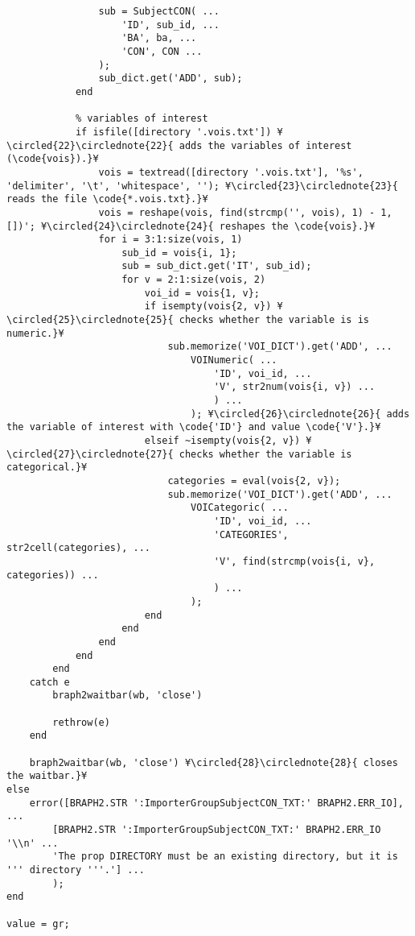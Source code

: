 \documentclass{tufte-handout}
\begin{document}
\begin{lstlisting}
                sub = SubjectCON( ...
                    'ID', sub_id, ...
                    'BA', ba, ...
                    'CON', CON ...
                );
                sub_dict.get('ADD', sub);
            end
            
            % variables of interest
            if isfile([directory '.vois.txt']) ¥\circled{22}\circlednote{22}{ adds the variables of interest (\code{vois}).}¥
                vois = textread([directory '.vois.txt'], '%s', 'delimiter', '\t', 'whitespace', ''); ¥\circled{23}\circlednote{23}{ reads the file \code{*.vois.txt}.}¥
                vois = reshape(vois, find(strcmp('', vois), 1) - 1, [])'; ¥\circled{24}\circlednote{24}{ reshapes the \code{vois}.}¥
                for i = 3:1:size(vois, 1)
                    sub_id = vois{i, 1};
                    sub = sub_dict.get('IT', sub_id);
                    for v = 2:1:size(vois, 2)
                        voi_id = vois{1, v};
                        if isempty(vois{2, v}) ¥\circled{25}\circlednote{25}{ checks whether the variable is is numeric.}¥
                            sub.memorize('VOI_DICT').get('ADD', ...
                                VOINumeric( ...
                                    'ID', voi_id, ...
                                    'V', str2num(vois{i, v}) ...
                                    ) ...
                                ); ¥\circled{26}\circlednote{26}{ adds the variable of interest with \code{'ID'} and value \code{'V'}.}¥
                        elseif ~isempty(vois{2, v}) ¥\circled{27}\circlednote{27}{ checks whether the variable is categorical.}¥
                            categories = eval(vois{2, v});
                            sub.memorize('VOI_DICT').get('ADD', ...
                                VOICategoric( ...
                                    'ID', voi_id, ...
                                    'CATEGORIES', str2cell(categories), ...
                                    'V', find(strcmp(vois{i, v}, categories)) ...
                                    ) ...
                                );
                        end                        
                    end
                end
            end
        end
    catch e
        braph2waitbar(wb, 'close')
        
        rethrow(e)
    end
    
	braph2waitbar(wb, 'close') ¥\circled{28}\circlednote{28}{ closes the waitbar.}¥
else
    error([BRAPH2.STR ':ImporterGroupSubjectCON_TXT:' BRAPH2.ERR_IO], ...
        [BRAPH2.STR ':ImporterGroupSubjectCON_TXT:' BRAPH2.ERR_IO '\\n' ...
        'The prop DIRECTORY must be an existing directory, but it is ''' directory '''.'] ...
        );
end

value = gr;
\end{lstlisting}
\end{document}
